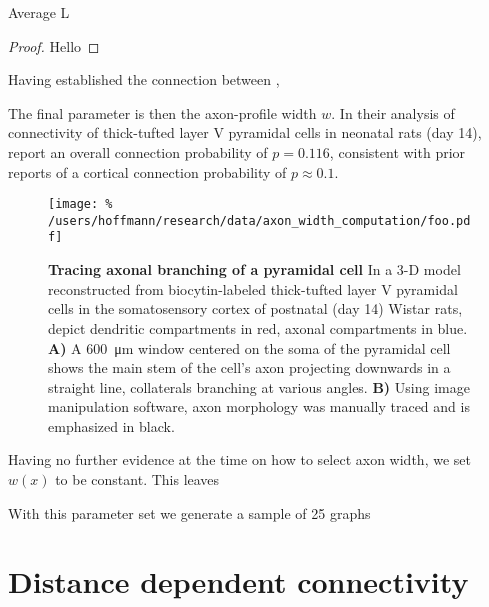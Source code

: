 \begin{proposition}
Average L
\end{proposition}

\begin{proof}
Hello
\end{proof}

Having established the connection between , 


The final parameter is then the axon-profile width $w$. In their
analysis of connectivity of thick-tufted layer V pyramidal cells in
neonatal rats (day 14), \textcite{Song2005} report an overall connection
probability of $p=0.116$, consistent with prior reports of a cortical
connection probability of $p \approx 0.1$. %

\begin{figure}[!htbp]
  \centering
  \texttt{[image: \%
    /users/hoffmann/research/data/axon\_width\_computation/foo.pdf]}%
  \caption{\textbf{Tracing axonal branching of a pyramidal cell} In a
    3-D model reconstructed from biocytin-labeled thick-tufted layer V
    pyramidal cells in the somatosensory cortex of postnatal (day 14)
    Wistar rats, \textcite{Romand2011} depict dendritic compartments in
    red, axonal compartments in blue.  \textbf{A)} A
    \SI{600}{\micro\meter} window centered on the soma of the pyramidal
    cell shows the main stem of the cell's axon projecting downwards in a
    straight line, collaterals branching at various angles. \textbf{B)}
    Using image manipulation software, axon morphology was manually traced
    and is emphasized in black.} %
  \label{fig:determine_axon_width}%
\end{figure}


Having no further evidence at the time on how to select axon width, we
set $w(x)$ to be constant. This leaves 



With this parameter set we generate a sample of 25 graphs %






\clearpage
\newpage
\section{Distance dependent connectivity}\label{sec:distance_connectivity}


